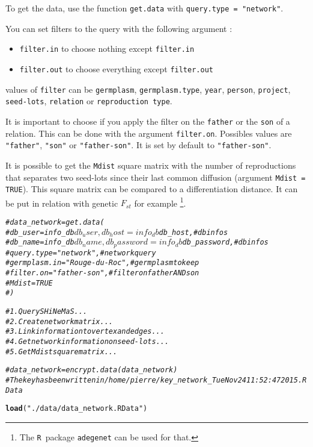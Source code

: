 \documentclass{article}\usepackage[]{graphicx}\usepackage[]{color}
\makeatletter
\newcommand{\hlstr}[1]{\textcolor[rgb]{0.192,0.494,0.8}{#1}}%
\newcommand{\hlcom}[1]{\textcolor[rgb]{0.678,0.584,0.686}{\textit{#1}}}%
\newcommand{\hlstd}[1]{\textcolor[rgb]{0.345,0.345,0.345}{#1}}%
\newcommand{\hlkwd}[1]{\textcolor[rgb]{0.737,0.353,0.396}{\textbf{#1}}}%
\newenvironment{kframe}{%
 \def\at@end@of@kframe{}%
 \ifinner\ifhmode%
  \def\at@end@of@kframe{\end{minipage}}%
  \begin{minipage}{\columnwidth}%
 \fi\fi%
 \def\FrameCommand##1{\hskip\@totalleftmargin \hskip-\fboxsep
 \colorbox{shadecolor}{##1}\hskip-\fboxsep
     \hskip-\linewidth \hskip-\@totalleftmargin \hskip\columnwidth}%
 \MakeFramed {\advance\hsize-\width
   \@totalleftmargin\z@ \linewidth\hsize
   \@setminipage}}%
 {\par\unskip\endMakeFramed%
 \at@end@of@kframe}
\newenvironment{knitrout}{}{} %
\newcommand{\R}{\texttt{R}}
\renewcommand{\sl}{seed-lots}
\makeatother
\begin{document}
To get the data, use the function \texttt{get.data} with \texttt{query.type = "network"}.

You can set filters to the query with the following argument :

\begin{itemize}
\item \texttt{filter.in} to choose nothing except \texttt{filter.in}
\item \texttt{filter.out} to choose everything except \texttt{filter.out}
\end{itemize}

values of \texttt{filter} can be \texttt{germplasm}, \texttt{germplasm.type}, \texttt{year}, \texttt{person}, \texttt{project}, \texttt{\sl}, \texttt{relation} or \texttt{reproduction type}.


It is important to choose if you apply the filter on the \texttt{father} or the \texttt{son} of a relation.
This can be done with the argument \texttt{filter.on}.
Possibles values are \texttt{"father"}, \texttt{"son"} or \texttt{"father-son"}.
It is set by default to \texttt{"father-son"}.

It is possible to get the \texttt{Mdist} square matrix with the number of reproductions that separates two seed-lots since their last common diffusion (argument \texttt{Mdist = TRUE}).
This square matrix can be compared to a differentiation distance. 
It can be put in relation with genetic $F_{st}$ for example \citep{nei_analysis_1973}\footnote{The \R~package \texttt{adegenet} can be used for that.}.


\begin{knitrout}
\color{fgcolor}\begin{kframe}
\begin{alltt}
\hlcom{#data_network = get.data(}
\hlcom{#	db_user = info_db$db_user, db_host = info_db$db_host, # db infos}
\hlcom{#	db_name = info_db$db_name, db_password = info_db$db_password, # db infos}
\hlcom{#	query.type = "network", # network query}
\hlcom{#	germplasm.in = "Rouge-du-Roc", # germplasm to keep}
\hlcom{#	filter.on = "father-son", # filter on father AND son}
\hlcom{#	Mdist = TRUE}
\hlcom{#	)}

\hlcom{# 1. Query SHiNeMaS ...}
\hlcom{# 2. Create network matrix ...}
\hlcom{# 3. Link information to vertex and edges ...}
\hlcom{# 4. Get network information on seed-lots ...}
\hlcom{# 5. Get Mdist square matrix ...}

\hlcom{#data_network = encrypt.data(data_network)}
\hlcom{#The key has been written in /home/pierre/key_network_Tue Nov 24 11:52:47 2015.RData}

\hlkwd{load}\hlstd{(}\hlstr{"./data/data_network.RData"}\hlstd{)}
\end{alltt}
\end{kframe}
\end{knitrout}
\end{document}
